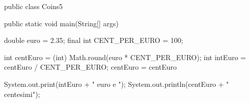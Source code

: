 \begin{unipdcode}[language=Java]
public class Coins5 {
    public static void main(String[] args) {
        double euro = 2.35;
        final int CENT_PER_EURO = 100;

        int centEuro = (int) Math.round(euro * CENT_PER_EURO);
        int intEuro = centEuro / CENT_PER_EURO;
        centEuro = centEuro %

        System.out.print(intEuro + " euro e ");
        System.out.println(centEuro + " centesimi");
    }
}
\end{unipdcode}
